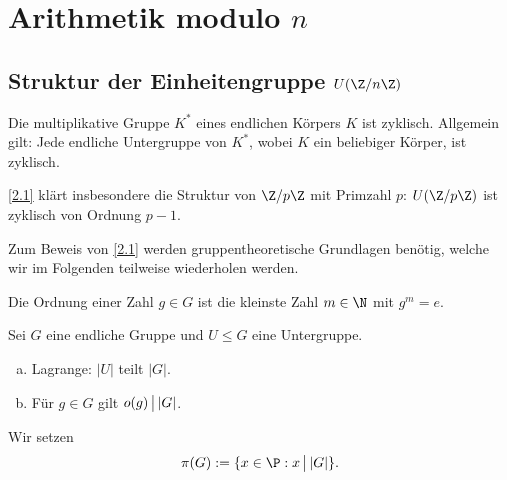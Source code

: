 \chapter{Arithmetik modulo $n$}


\section{Struktur der Einheitengruppe $U(\Z/ n\Z)$}


\begin{st} \label{2.1}
	Die multiplikative Gruppe $K^*$ eines endlichen Körpers $K$ ist zyklisch.
	Allgemein gilt: Jede endliche Untergruppe von $K^*$, wobei $K$ ein beliebiger Körper, ist zyklisch.
	\begin{note}
		\ref{2.1} klärt insbesondere die Struktur von $\Z / p\Z$ mit Primzahl $p$: $U(\Z / p\Z)$ ist zyklisch von Ordnung $p - 1$.

		Zum Beweis von \ref{2.1} werden gruppentheoretische Grundlagen benötig, welche wir im Folgenden teilweise wiederholen werden.
	\end{note}
\end{st}

\begin{df*}
	Die Ordnung einer Zahl $g \in G$ ist die kleinste Zahl $m \in \N$ mit $g^m = e$.
\end{df*}

\begin{st} \label{2.2}
	Sei $G$ eine endliche Gruppe und $U \le G$ eine Untergruppe.
	\begin{enumerate}[a)]
		\item
			Lagrange: $|U|$ teilt $|G|$.
		\item
			Für $g \in G$ gilt $o(g) \divs |G|$.
	\end{enumerate}
\end{st}

\begin{df*}
	Wir setzen
	\[
		\pi(G) := \{ x \in \P : x \divs |G| \}.
	\]
\end{df*}

